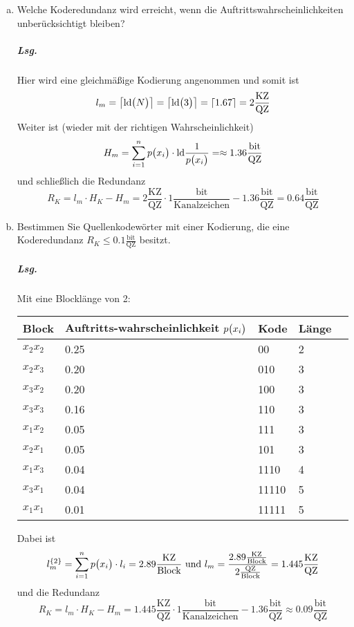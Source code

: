 \documentclass{scrreprt}
\newcommand{\ld}{\text{ld}}
\begin{document}
\begin{enumerate}[(a)]
\item Welche Koderedundanz wird erreicht, wenn die Auftrittswahrscheinlichkeiten
  unberücksichtigt bleiben?

  \subparagraph{Lsg.} Hier wird eine gleichmäßige Kodierung angenommen und somit ist
  \[
    l_m = \left\lceil \ld\qty\big(N) \right\rceil
    = \left\lceil \ld\qty\big(3) \right\rceil
    = \left\lceil 1.67 \right\rceil
    = 2 \frac{\text{KZ}}{\text{QZ}}
  \]
  Weiter ist (wieder mit der richtigen Wahrscheinlichkeit)
  \[
    H_m = \sum_{i = 1}^n p\qty\big(x_i) \cdot \ld \frac{1}{p\qty\big(x_i)} = \approx 1.36 \frac{\text{bit}}{\text{QZ}}
  \]
  und schließlich die Redundanz
  \[
    R_K = l_m \cdot H_K - H_m = 2 \frac{\text{KZ}}{\text{QZ}} \cdot 1 \frac{\text{bit}}{\text{Kanalzeichen}} - 1.36 \frac{\text{bit}}{\text{QZ}} = 0.64 \frac{\text{bit}}{\text{QZ}}
  \]

\item Bestimmen Sie Quellenkodewörter mit einer Kodierung, die eine Koderedundanz
  $R_K \leq 0.1 \frac{\text{bit}}{\text{QZ}}$ besitzt.

  \subparagraph{Lsg.} Mit eine Blocklänge von 2:

  \begin{tabularx}{\textwidth}{|X|X|X|X|X|}
    \hline
    Block & Auftritts-wahrscheinlichkeit $p\qty\big(x_i)$ & Kode & Länge \\
    \hline
    $x_2x_2$ & 0.25 & 00    & 2 \\
    $x_2x_3$ & 0.20 & 010   & 3 \\
    $x_3x_2$ & 0.20 & 100   & 3 \\
    $x_3x_3$ & 0.16 & 110   & 3 \\
    $x_1x_2$ & 0.05 & 111   & 3 \\
    $x_2x_1$ & 0.05 & 101   & 3 \\
    $x_1x_3$ & 0.04 & 1110  & 4 \\
    $x_3x_1$ & 0.04 & 11110 & 5 \\
    $x_1x_1$ & 0.01 & 11111 & 5 \\
    \hline
  \end{tabularx}
  Dabei ist
  \[
    l_m^{\qty{2}} = \sum_{i = 1}^n p\qty\big(x_i) \cdot l_i = 2.89 \frac{\text{KZ}}{\text{Block}}
    \text{ und }
    l_m = \frac{2.89 \frac{\text{KZ}}{\text{Block}}}{2 \frac{\text{QZ}}{\text{Block}}} = 1.445 \frac{\text{KZ}}{\text{QZ}}
  \]
  und die Redundanz
  \[
    R_K = l_m \cdot H_K - H_m = 1.445 \frac{\text{KZ}}{\text{QZ}} \cdot 1 \frac{\text{bit}}{\text{Kanalzeichen}} - 1.36 \frac{\text{bit}}{\text{QZ}} \approx 0.09 \frac{\text{bit}}{\text{QZ}}
  \]
\end{enumerate}
\end{document}

